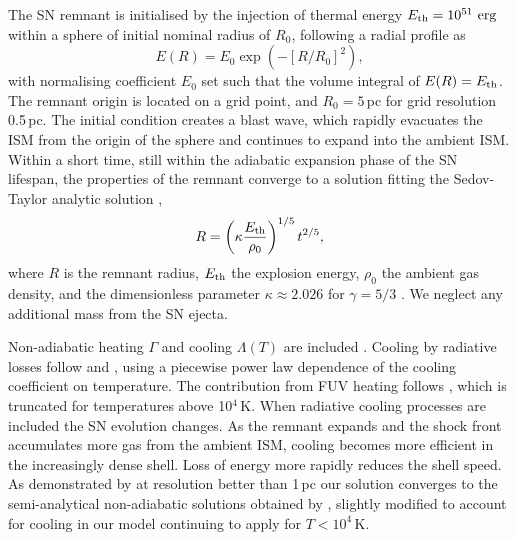 \documentclass[fleqn,usenatbib]{mnras}
\newcommand\EST{E_{\rm th}}
\newcommand\erg{~ {\rm erg}}
\begin{document}
  The SN remnant is initialised by the injection of thermal energy 
  $\EST = 10^{51}\erg$ within a sphere of initial nominal radius of {$R_0$}, 
  following a radial profile as 
  \begin{equation}  
     E(R) = E_0\exp\left(-\left[
     R/{R_0}
  \right]^{{2}}\right),
  \end{equation}
  with normalising coefficient $E_0$ set such that the volume integral of
  $E(R)=\EST$.
  The remnant origin is located on a grid point, and $R_0 = 5$\,pc for
  grid resolution 0.5\,pc.
  The initial condition creates a blast wave, which rapidly evacuates the ISM
  from the origin of the sphere and continues to expand into the ambient ISM.
  Within a short time, still within the adiabatic expansion phase of the 
  SN lifespan, the properties of the remnant converge to a solution fitting
  the Sedov-Taylor analytic solution \citep{Taylor50,Sedov59},
  \begin{equation}
    \label{eq:sed}
    R= \left(\kappa\frac{\EST}{\rho_{0}}\right)^{{1}/{5}}t^{{2}/{5}},
  \end{equation}
  where $R$ is the remnant radius, $\EST$ the explosion energy, $\rho_{0}$ the
  ambient gas density, and the dimensionless parameter $\kappa\approx2.026$ for
  $\gamma=5/3$ \citep{Ostriker88}.
  We neglect any additional mass from the SN ejecta.

 Non-adiabatic heating $\Gamma$ and cooling $\Lambda (T)$ are included
 \citep{Gent:2013b}.
 Cooling by radiative losses follow \citet{Wolfire:1995} and
 \citet{Sarazin:1987}, using a piecewise power law dependence of the cooling
 coefficient on temperature.
 The contribution from FUV heating follows
 \citet[][see \citep{Gent:2013a}]{Wolfire:1995}, which is truncated for
 temperatures above 10$^{4}$\,K.
 When radiative cooling processes are included the SN evolution changes.
 As the remnant expands and the shock front accumulates more gas from the
 ambient ISM, cooling becomes more efficient in the increasingly dense shell.
 Loss of energy more rapidly reduces the shell speed.  
 As demonstrated by \citet{GMKSH20} at resolution better than 1\,pc our 
 solution converges to the semi-analytical non-adiabatic solutions obtained by 
 \citet{Cioffi88}, slightly modified to account for cooling in our model
 continuing to apply for $T<10^4$\,K.
\end{document}
